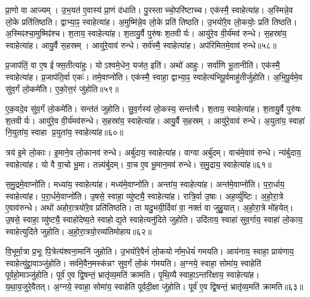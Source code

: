 प्रा॒णो वा आज्यम्।
उ॒भ॒यत॑ ए॒वास्य॑ प्रा॒णं द॑धाति।
पु॒रस्ताच्चो॒परि॑ष्टाच्च।
एक॑स्मै॒ स्वाहेत्या॑ह।
अ॒स्मिन्ने॒व लो॒के प्रति॑तिष्ठति।
द्वाभ्या॒ꣴ॒ स्वाहेत्या॑ह।
अ॒मुष्मि॑न्ने॒व लो॒के प्रति॑ तिष्ठति।
उ॒भयो॑रे॒व लो॒कयोः॒ प्रति॑ तिष्ठति।
अ॒स्मिꣴश्चा॒मुष्मिꣴ॑श्च।
श॒ताय॒ स्वाहेत्या॑ह।
श॒तायु॒र्वै पुरु॑षः श॒तवीर्यः।
आयु॑रे॒व वी॒र्य॑मव॑ रुन्धे।
स॒हस्रा॑य॒ स्वाहेत्या॑ह।
आयु॒र्वै स॒हस्रम्।
आयु॑रे॒वाव॑ रुन्धे।
सर्व॑स्मै॒ स्वाहेत्या॑ह।
अप॑रिमितमे॒वाव॑ रुन्धे॥५८॥\anuvakamend[ए॒व य॒ज्ञाद्रक्षा॒ꣳ॒स्यप॑हन्त्यन्त॒तो जु॑होति श॒ताय॒ स्वाहेत्या॑ह स॒प्त च॑]

प्र॒जाप॑तिं॒ वा ए॒ष ई\hspace{0.4ex}\hspace{-0.4ex}फ्स॒तीत्या॑हुः।
योऽश्वमे॒धेन॒ यज॑त॒ इति॑।
अथो॑ आहुः।
सर्वा॑णि भू॒तानीति॑।
एक॑स्मै॒ स्वाहेत्या॑ह।
प्र॒जाप॑ति॒र्वा एकः॑।
तमे॒वाप्नो॑ति।
एक॑स्मै॒ स्वाहा॒ द्वाभ्या॒ꣴ॒ स्वाहेत्य॑भिपू॒र्वमाहु॑तीर्जुहोति।
अ॒भि॒पू॒र्वमे॒व सु॑व॒र्गं लो॒कमे॑ति।
ए॒को॒त्त॒रं जु॑होति॥५९॥

ए॒क॒वदे॒व सु॑व॒र्गं लो॒कमे॑ति।
सन्त॑तं जुहोति।
सु॒व॒र्गस्य॑ लो॒कस्य॒ सन्त॑त्यै।
श॒ताय॒ स्वाहेत्या॑ह।
श॒तायु॒र्वै पुरु॑षः श॒तवीर्यः।
आयु॑रे॒व वी॒र्य॑मव॑रुन्धे।
स॒हस्रा॑य॒ स्वाहेत्या॑ह।
आयु॒र्वै स॒हस्रम्।
आयु॑रे॒वाव॑ रुन्धे।
अ॒युता॑य॒ स्वाहा॑ नि॒युता॑य॒ स्वाहा प्र॒युता॑य॒ स्वाहेत्या॑ह॥६०॥

त्रय॑ इ॒मे लो॒काः।
इ॒माने॒व लो॒कानव॑ रुन्धे।
अर्बु॑दाय॒ स्वाहेत्या॑ह।
वाग्वा अर्बु॑दम्।
वाच॑मे॒वाव॑ रुन्धे।
न्य॑र्बुदाय॒ स्वाहेत्या॑ह।
यो वै वा॒चो भू॒मा।
तन्न्य॑र्बुदम्।
वा॒च ए॒व भू॒मान॒मव॑ रुन्धे।
स॒मु॒द्राय॒ स्वाहेत्या॑ह॥६१॥

स॒मु॒द्रमे॒वाप्नो॑ति।
मध्या॑य॒ स्वाहेत्या॑ह।
मध्य॑मे॒वाप्नो॑ति।
अन्ता॑य॒ स्वाहेत्या॑ह।
अन्त॑मे॒वाप्नो॑ति।
प॒रा॒र्धाय॒ स्वाहेत्या॑ह।
प॒रा॒र्धमे॒वाप्नो॑ति।
उ॒षसे॒ स्वाहा॒ व्यु॑ष्ट्यै॒ स्वाहेत्या॑ह।
रात्रि॒र्वा उ॒षाः।
अह॒र्व्यु॑ष्टिः।
अ॒हो॒रा॒त्रे ए॒वाव॑रुन्धे।
अथो॑ अहोरा॒त्रयो॑रे॒व प्रति॑तिष्ठति।
ता यदु॒भयी॒र्दिवा॑ वा॒ नक्तं॑ वा जुहु॒यात्।
अ॒हो॒रा॒त्रे मो॑हयेत्।
उ॒षसे॒ स्वाहा॒ व्यु॑ष्ट्यै॒ स्वाहो॑देष्य॒ते स्वाहोद्य॒ते स्वाहेत्यनु॑दिते जुहोति।
उदि॑ताय॒ स्वाहा॑ सुव॒र्गाय॒ स्वाहा॑ लो॒काय॒ स्वाहेत्युदि॑ते जुहोति।
अ॒हो॒रा॒त्रयो॒रव्य॑तिमोहाय॥६२॥\anuvakamend[ए॒को॒त्त॒रं जु॑होति प्र॒युता॑य॒ स्वाहेत्या॑ह समु॒द्राय॒ स्वाहेत्या॒हाह॒र्व्यु॑ष्टिः स॒प्त च॑]

वि॒भूर्मा॒त्रा प्र॒भूः पि॒त्रेत्य॑श्वना॒मानि॑ जुहोति।
उ॒भयो॑रे॒वैनं॑ लो॒कयोर्नाम॒धेयं॑ गमयति।
आय॑नाय॒ स्वाहा॒ प्राय॑णाय॒ स्वाहेत्यु॑द्द्रा॒वाञ्जु॑होति।
सर्व॑मे॒वैन॒मस्क॑न्नꣳ सुव॒र्गं लो॒कं ग॑मयति।
अ॒ग्नये॒ स्वाहा॒ सोमा॑य॒ स्वाहेति॑ पूर्वहो॒माञ्जु॑होति।
पूर्व॑ ए॒व द्वि॒षन्तं॒ भ्रातृ॑व्य॒मति॑ क्रामति।
पृ॒थि॒व्यै स्वाहा॒\-ऽन्तरि॑क्षाय॒ स्वाहेत्या॑ह।
य॒था॒य॒जुरे॒वैतत्।
अ॒ग्नये॒ स्वाहा॒ सोमा॑य॒ स्वाहेति॑ पूर्वदी॒क्षा जु॑होति।
पूर्व॑ ए॒व द्वि॒षन्तं॒ भ्रातृ॑व्य॒मति॑ क्रामति॥६३॥

